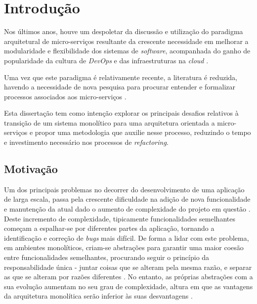 \chapter{Introdução}


    Nos últimos anos, houve um despoletar da discussão e utilização do paradigma arquitetural de micro-serviços resultante da crescente necessidade em melhorar a modularidade e flexibilidade dos sistemas de \textit{software}, acompanhada do ganho de popularidade da cultura  de \textit{DevOps} e das infraestruturas na \textit{cloud} \citep{most_prominent_areas_of_research_ms_hamzehloui}. 
    
    Uma vez que este paradigma é relativamente recente, a literatura é reduzida, havendo a necessidade de nova pesquisa para procurar entender e formalizar processos associados aos micro-serviços \citep{most_prominent_areas_of_research_ms_hamzehloui}.
    
    
    Esta dissertação tem como intenção explorar os principais desafios relativos à transição de um sistema monolítico para uma arquitetura orientada a micro-serviços e propor uma metodologia que auxilie nesse processo, reduzindo o tempo e investimento necessário nos processos de \textit{refactoring}.
    
    
    
\section{Motivação}

    Um dos principais problemas no decorrer do desenvolvimento de uma aplicação de larga escala, passa pela crescente dificuldade na adição de nova funcionalidade e manutenção da atual dado o aumento de complexidade do projeto em questão \citep{buildingmaintainablesoftware2016}. Deste incremento de complexidade, tipicamente funcionalidades semelhantes começam a espalhar-se por diferentes partes da aplicação, tornando a identificação e correção de \textit{bugs} mais difícil. De forma a lidar com este problema, em ambientes monolíticos, criam-se abstrações para garantir uma maior coesão entre funcionalidades semelhantes, procurando seguir o princípio da responsabilidade única - juntar coisas que se alteram pela mesma razão, e separar as que se alteram por razões diferentes \citep{newman2015microservices}. No entanto, as próprias abstrações com a sua evolução aumentam no seu grau de complexidade, altura em que as vantagens da arquitetura monolítica serão inferior às suas desvantagens \citep{monolithtomicroserviceschen17}.
    

